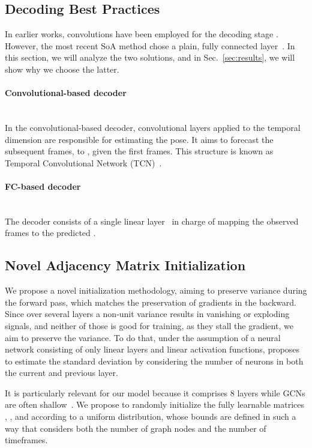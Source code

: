 \documentclass[10pt,twocolumn,letterpaper]{article}
\begin{document}
\subsection{Decoding Best Practices}\label{ssec:dec}
In earlier works, convolutions have been employed for the decoding stage \cite{gehring2017convolutional, luo2018faf, sofianos21}. However, the most recent SoA method chose a plain, fully connected layer~\cite{guo2022back}. In this section, we will analyze the two solutions, and in Sec.~\ref{sec:results}, we will show why we choose the latter.

\paragraph{Convolutional-based decoder}\label{par:conv} ~\\
In the convolutional-based decoder, convolutional layers applied to the temporal dimension are responsible for estimating the pose. It aims to forecast the subsequent frames,  to , given the first  frames. This structure is known as Temporal Convolutional Network (TCN)~\cite{gehring2017convolutional, luo2018faf, sofianos21}.


\paragraph{FC-based decoder}  \greencheck \label{par:fc}\\
The decoder consists of a single linear layer~\cite{guo2022back} in charge of mapping the observed  frames to the predicted .


\subsection{Novel Adjacency Matrix Initialization}\label{ssec:init}

We propose a novel initialization methodology, aiming to preserve variance during the forward pass, which matches the preservation of gradients in the backward.
Since over several layers a non-unit variance results in vanishing or exploding signals, and neither of those is good for training, as they stall the gradient, we aim to preserve the variance.
To do that, under the assumption of a neural network consisting of only linear layers and linear activation functions, \cite{glorot10} proposes to estimate the standard deviation by considering the number of neurons in both the current and previous layer.

It is particularly relevant for our model because it comprises 8 layers while GCNs are often shallow~\cite{kipf17}.
We propose to randomly initialize the fully learnable matrices , , and  according to a uniform distribution, whose bounds are defined in such a way that considers both the number of graph nodes and the number of timeframes.
\end{document}
